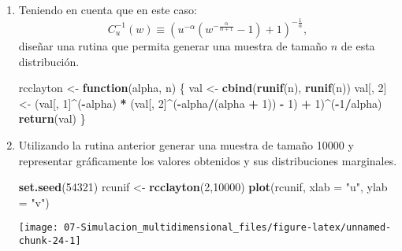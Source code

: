 \documentclass[
]{book}
\newenvironment{Shaded}{\begin{snugshade}}{\end{snugshade}}
\newcommand{\ControlFlowTok}[1]{\textcolor[rgb]{0.13,0.29,0.53}{\textbf{#1}}}
\newcommand{\DataTypeTok}[1]{\textcolor[rgb]{0.13,0.29,0.53}{#1}}
\newcommand{\DecValTok}[1]{\textcolor[rgb]{0.00,0.00,0.81}{#1}}
\newcommand{\KeywordTok}[1]{\textcolor[rgb]{0.13,0.29,0.53}{\textbf{#1}}}
\newcommand{\NormalTok}[1]{#1}
\newcommand{\OperatorTok}[1]{\textcolor[rgb]{0.81,0.36,0.00}{\textbf{#1}}}
\newcommand{\StringTok}[1]{\textcolor[rgb]{0.31,0.60,0.02}{#1}}
\theoremstyle{break}
\theoremstyle{definition}
\theoremstyle{definition}
\theoremstyle{definition}
\theoremstyle{remark}
\begin{document}
\begin{enumerate}
\def\labelenumi{\alph{enumi})}
\item
  Teniendo en cuenta que en este caso:
  \[C_{u}^{-1}(w)\equiv\left(  u^{-\alpha}\left(  
  w^{-\frac{\alpha}{\alpha+1}}-1\right) + 1 \right)^{-\frac{1}{\alpha}},\]
  diseñar una rutina que permita generar una muestra de tamaño \(n\)
  de esta distribución.

\begin{Shaded}
\begin{Highlighting}[]
\NormalTok{rcclayton <-}\StringTok{ }\ControlFlowTok{function}\NormalTok{(alpha, n) \{}
\NormalTok{  val <-}\StringTok{ }\KeywordTok{cbind}\NormalTok{(}\KeywordTok{runif}\NormalTok{(n), }\KeywordTok{runif}\NormalTok{(n))}
\NormalTok{  val[, }\DecValTok{2}\NormalTok{] <-}\StringTok{ }\NormalTok{(val[, }\DecValTok{1}\NormalTok{]}\OperatorTok{^}\NormalTok{(}\OperatorTok{-}\NormalTok{alpha) }\OperatorTok{*}\StringTok{ }
\StringTok{              }\NormalTok{(val[, }\DecValTok{2}\NormalTok{]}\OperatorTok{^}\NormalTok{(}\OperatorTok{-}\NormalTok{alpha}\OperatorTok{/}\NormalTok{(alpha }\OperatorTok{+}\StringTok{ }\DecValTok{1}\NormalTok{)) }\OperatorTok{-}\StringTok{ }\DecValTok{1}\NormalTok{) }\OperatorTok{+}\StringTok{ }\DecValTok{1}\NormalTok{)}\OperatorTok{^}\NormalTok{(}\OperatorTok{-}\DecValTok{1}\OperatorTok{/}\NormalTok{alpha)}
  \KeywordTok{return}\NormalTok{(val)}
\NormalTok{\}}
\end{Highlighting}
\end{Shaded}
\item
  Utilizando la rutina anterior generar una muestra de tamaño
  10000 y representar gráficamente los valores obtenidos y sus
  distribuciones marginales.

\begin{Shaded}
\begin{Highlighting}[]
\KeywordTok{set.seed}\NormalTok{(}\DecValTok{54321}\NormalTok{)}
\NormalTok{rcunif <-}\StringTok{ }\KeywordTok{rcclayton}\NormalTok{(}\DecValTok{2}\NormalTok{,}\DecValTok{10000}\NormalTok{)}
\KeywordTok{plot}\NormalTok{(rcunif, }\DataTypeTok{xlab =} \StringTok{"u"}\NormalTok{, }\DataTypeTok{ylab =} \StringTok{"v"}\NormalTok{)}
\end{Highlighting}
\end{Shaded}

  \begin{center}\texttt{[image: 07-Simulacion\_multidimensional\_files/figure-latex/unnamed-chunk-24-1]} \end{center}


\end{enumerate}
\end{document}
